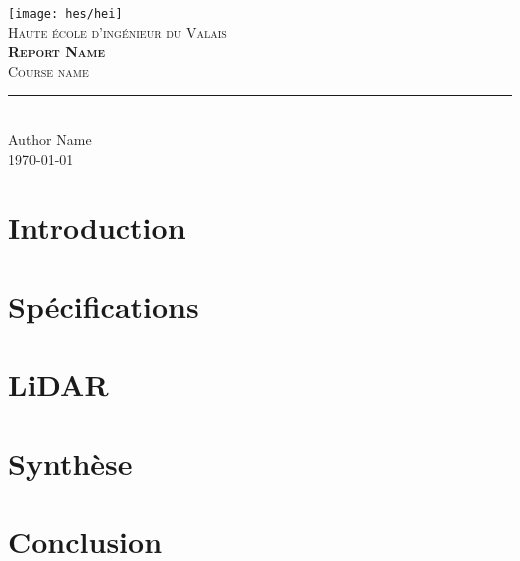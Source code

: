 \documentclass[11pt,titlepage]{report}
\begin{document}
\begin{titlepage}
	\centering
    \texttt{[image: hes/hei]}\\[1cm] 	%
    \textsc{\LARGE Haute école d'ingénieur du Valais}\\ \vspace{\fill}
    \textbf{\textsc{\fontsize{35}{35}\selectfont Report Name}}\\ \vspace{\fill}
	\textsc{\LARGE Course name}\\[0.4cm]
	\rule{\linewidth}{0.2 mm} \\[0.5 cm]
	Author Name \\
	\today
\end{titlepage}
\restoregeometry

\tableofcontents

\chapter{Introduction}


\chapter{Spécifications}


\chapter{LiDAR}



\chapter{Synthèse}


\chapter{Conclusion}

\end{document}
